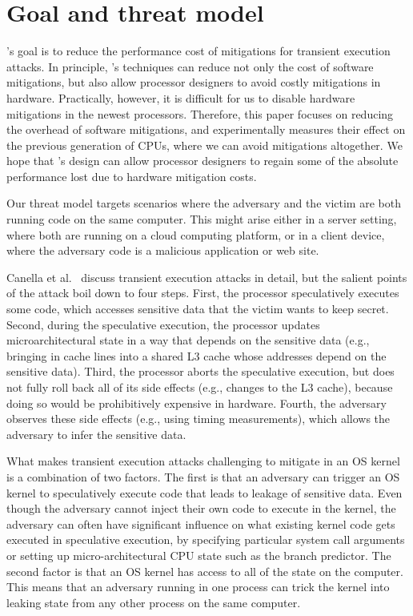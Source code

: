\section*{Goal and threat model}

\sys's goal is to reduce the performance cost of mitigations for transient
execution attacks.  In principle, \sys's techniques can reduce not only
the cost of software mitigations, but also allow processor designers
to avoid costly mitigations in hardware.  Practically, however, it is
difficult for us to disable hardware mitigations in the newest processors.
Therefore, this paper focuses on reducing the overhead
of software mitigations, and experimentally measures their effect on the
previous generation of CPUs, where we can avoid mitigations altogether.
We hope that \sys's design can allow processor designers to regain some
of the absolute performance lost due to hardware mitigation costs.

Our threat model targets scenarios where the adversary
and the victim are both running code on the same computer.  This might
arise either in a server setting, where both are running on a cloud
computing platform, or in a client device, where the adversary code is
a malicious application or web site.

Canella et al.~\cite{sok:transient} discuss transient execution attacks
in detail, but the salient points of the attack boil down to four steps.
First, the processor speculatively executes some code, which accesses
sensitive data that the victim wants to keep secret.  Second, during the
speculative execution, the processor updates microarchitectural state
in a way that depends on the sensitive data (e.g., bringing in cache
lines into a shared L3 cache whose addresses depend on the sensitive
data).  Third, the processor aborts the speculative execution, but does
not fully roll back all of its side effects (e.g., changes to the L3
cache), because doing so would be prohibitively expensive in hardware.
Fourth, the adversary observes these side effects (e.g., using timing
measurements), which allows the adversary to infer the sensitive data.

What makes transient execution attacks challenging to mitigate in an
OS kernel is a combination of two factors.  The first is that an
adversary can trigger an OS kernel to speculatively execute code that
leads to leakage of sensitive data.  Even though the adversary cannot
inject their own code to execute in the kernel, the adversary can often
have significant influence on what existing kernel code gets executed in
speculative execution, by specifying particular system call arguments or
setting up micro-architectural CPU state such as the branch predictor.
The second factor is that an OS kernel has access to all of the state
on the computer.  This means that an adversary running in one process
can trick the kernel into leaking state from any other process on the
same computer.

